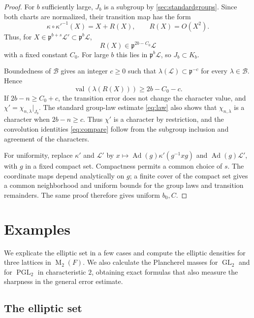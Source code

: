 \documentclass[11pt,reqno]{amsart}
\numberwithin{equation}{section}
\theoremstyle{plain}
\theoremstyle{definition}
\theoremstyle{remark}
\theoremstyle{plain}
\newcommand{\pp}{\mathfrak{p}}   %
\newcommand{\Lat}{\mathcal{L}}   %
\newcommand{\g}{\mathfrak{g}}    %
\DeclareMathOperator{\Ad}{Ad}
\DeclareMathOperator{\val}{val}
\DeclareMathOperator{\GL}{GL}
\DeclareMathOperator{\PGL}{PGL}
\DeclareMathOperator{\Mat}{M}
\newcommand{\lf}{\lambda}
\begin{document}
\begin{proof}
For $b$ sufficiently large, $J_b$ is a subgroup by
\cref{sec:standardgroups}. Since both charts are normalized, their
transition map has the form
\[
\kappa\circ\kappa'^{-1}(X)=X+R(X),\qquad R(X)=O(X^2).
\]
Thus, for $X\in\pp^{b+s}\Lat'\subset\pp^b\Lat$,
\[
R(X)\in\pp^{2b-C_0}\Lat
\]
with a fixed constant $C_0$. For large $b$ this lies in $\pp^b\Lat$,
so $J_b\subset K_b$.

Boundedness of $\mathcal B$ gives an integer $c\ge0$ such that
$\lf(\Lat)\subset\pp^{-c}$ for every $\lf\in\mathcal B$. Hence
\[
\val(\lf(R(X)))\ge2b-C_0-c.
\]
If $2b-n\ge C_0+c$, the transition error does not change the
character value, and $\chi'=\chi_{n,\lf}|_{J_b}$.
The standard group-law estimate \eqref{eq:law} also shows that
$\chi_{n,\lf}$ is a character when $2b-n\ge c$.
Thus $\chi'$ is a character by restriction, and the convolution
identities \eqref{eq:compare} follow from the subgroup inclusion
and agreement of the characters.

For uniformity, replace $\kappa'$ and $\Lat'$ by
$x\mapsto\Ad(g)\kappa'(g^{-1}xg)$ and $\Ad(g)\Lat'$, with $g$
in a fixed compact set. Compactness permits a common choice of $s$.
The coordinate maps depend analytically on $g$; a finite cover of
the compact set gives a common neighborhood and uniform bounds
for the group laws and transition remainders. The same proof
therefore gives uniform $b_0,C$.
\end{proof}


\section{Examples}\label{sec:examples}

We explicate the elliptic set in a few cases and compute the elliptic
densities for three lattices in $\Mat_2(F)$.
We also calculate the Plancherel masses for $\GL_2$ and for $\PGL_2$
in characteristic $2$, obtaining exact formulas that also measure the
sharpness in the general error estimate.

\subsection{The elliptic set}
\end{document}
